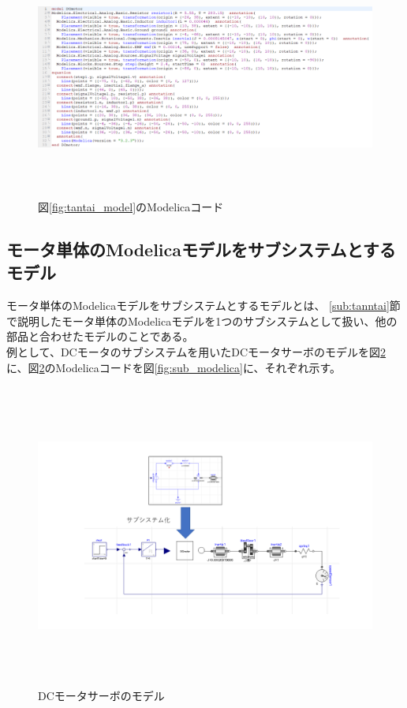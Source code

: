 % 	

\begin{figure}[t]
	\centering
	\includegraphics[width=16.5cm,height=8cm]{./Image/tantai_modelica.png}
	\caption{図\ref{fig:tantai_model}のModelicaコード}
	\label{fig:tantai_modelica}
  \end{figure}


\subsection{モータ単体のModelicaモデルをサブシステムとするモデル} \label{sub:submodel}
モータ単体のModelicaモデルをサブシステム\cite{modelicaシステム本}とするモデルとは、
\ref{sub:tanntai}節で説明したモータ単体のModelicaモデルを1つのサブシステムとして扱い、他の部品と合わせたモデルのことである。\\
例として、DCモータのサブシステムを用いたDCモータサーボのモデルを図\ref{fig:submodel}に、図\ref{fig:submodel}のModelicaコードを図\ref{fig:sub_modelica}に、それぞれ示す。

\begin{figure}[t]
	\centering
	\includegraphics[width=16.5cm,height=10cm]{./Image/submodel_pack.png}
	\caption{DCモータサーボのモデル}
	\label{fig:submodel}
  \end{figure}

